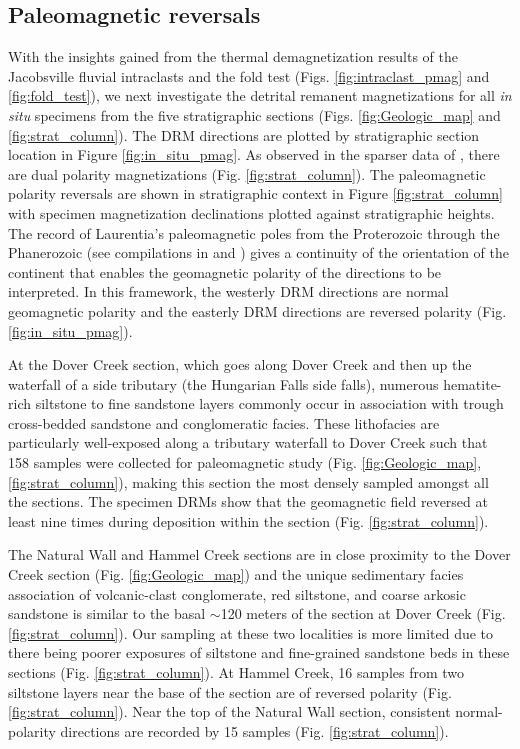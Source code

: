 \subsection*{Paleomagnetic reversals}

With the insights gained from the thermal demagnetization results of the Jacobsville fluvial intraclasts and the fold test (Figs. \ref{fig:intraclast_pmag} and \ref{fig:fold_test}), we next investigate the detrital remanent magnetizations for all \textit{in situ} specimens from the five stratigraphic sections (Figs. \ref{fig:Geologic_map} and \ref{fig:strat_column}). The DRM directions are plotted by stratigraphic section location in Figure \ref{fig:in_situ_pmag}. As observed in the sparser data of , there are dual polarity magnetizations (Fig. \ref{fig:strat_column}). The paleomagnetic polarity reversals are shown in stratigraphic context in Figure \ref{fig:strat_column} with specimen magnetization declinations plotted against stratigraphic heights. The record of Laurentia's paleomagnetic poles from the Proterozoic through the Phanerozoic (see compilations in  and ) gives a continuity of the orientation of the continent that enables the geomagnetic polarity of the directions to be interpreted. In this framework, the westerly DRM directions are normal geomagnetic polarity and the easterly DRM directions are reversed polarity (Fig. \ref{fig:in_situ_pmag}). 

At the Dover Creek section, which goes along Dover Creek and then up the waterfall of a side tributary (the Hungarian Falls side falls), numerous hematite-rich siltstone to fine sandstone layers commonly occur in association with trough cross-bedded sandstone and conglomeratic facies. These lithofacies are particularly well-exposed along a tributary waterfall to Dover Creek such that 158 samples were collected for paleomagnetic study (Fig. \ref{fig:Geologic_map}, \ref{fig:strat_column}), making this section the most densely sampled amongst all the sections. The specimen DRMs show that the geomagnetic field reversed at least nine times during deposition within the section (Fig. \ref{fig:strat_column}). 

The Natural Wall and Hammel Creek sections are in close proximity to the Dover Creek section (Fig. \ref{fig:Geologic_map}) and the unique sedimentary facies association of volcanic-clast conglomerate, red siltstone, and coarse arkosic sandstone is similar to the basal $\sim$120 meters of the section at Dover Creek (Fig. \ref{fig:strat_column}). Our sampling at these two localities is more limited due to there being poorer exposures of siltstone and fine-grained sandstone beds in these sections (Fig. \ref{fig:strat_column}). At Hammel Creek, 16 samples from two siltstone layers near the base of the section are of reversed polarity (Fig. \ref{fig:strat_column}). Near the top of the Natural Wall section, consistent normal-polarity directions are recorded by 15 samples (Fig. \ref{fig:strat_column}). 

